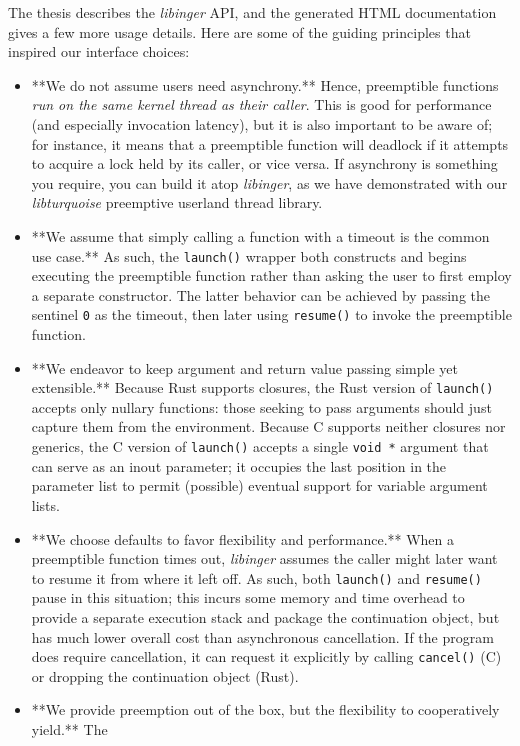 \documentclass[12pt,letterpaper]{book}
\begin{document}
The thesis describes the \textit{libinger} API, and the generated HTML documentation gives a few more usage
details.  Here are some of the guiding principles that inspired our interface choices:
\begin{itemize}
\item **We do not assume users need asynchrony.**  Hence, preemptible functions \textit{run on the same kernel
	thread as their caller}.  This is good for performance (and especially invocation latency), but
	it is also important to be aware of; for instance, it means that a preemptible function will
	deadlock if it attempts to acquire a lock held by its caller, or vice versa.  If asynchrony is
	something you require, you can build it atop \textit{libinger}, as we have demonstrated with our
	\textit{libturquoise} preemptive userland thread library.
\item **We assume that simply calling a function with a timeout is the common use case.**  As such, the
	\texttt{launch()} wrapper both constructs and begins executing the preemptible function rather than
	asking the user to first employ a separate constructor.  The latter behavior can be achieved by
	passing the sentinel \texttt{0} as the timeout, then later using \texttt{resume()} to invoke the preemptible
	function.
\item **We endeavor to keep argument and return value passing simple yet extensible.**  Because Rust
	supports closures, the Rust version of \texttt{launch()} accepts only nullary functions: those seeking
	to pass arguments should just capture them from the environment.  Because C supports neither
	closures nor generics, the C version of \texttt{launch()} accepts a single \texttt{void *} argument that can
	serve as an inout parameter; it occupies the last position in the parameter list to permit
	(possible) eventual support for variable argument lists.
\item **We choose defaults to favor flexibility and performance.**  When a preemptible function times
	out, \textit{libinger} assumes the caller might later want to resume it from where it left off.  As
	such, both \texttt{launch()} and \texttt{resume()} pause in this situation; this incurs some memory and time
	overhead to provide a separate execution stack and package the continuation object, but has much
	lower overall cost than asynchronous cancellation.  If the program does require cancellation, it
	can request it explicitly by calling \texttt{cancel()} (C) or dropping the continuation object (Rust).
\item **We provide preemption out of the box, but the flexibility to cooperatively yield.**  The

\end{itemize}
\end{document}
